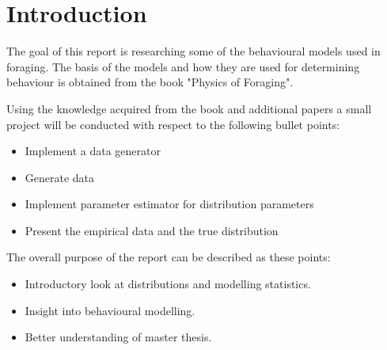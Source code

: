\chapter{Introduction}
The goal of this report is researching some of the behavioural models used in foraging. The basis of the models and how they are used for determining behaviour is obtained from the book "Physics of Foraging"\cite{viswanathan2011the}.

Using the knowledge acquired from the book and additional papers a small project will be conducted with respect to the following bullet points:
\begin{itemize}
\item Implement a data generator
\item Generate data
\item Implement parameter estimator for distribution parameters
\item Present the empirical data and the true distribution 
\end{itemize}

The overall purpose of the report can be described as these points:
\begin{itemize}
\item Introductory look at distributions and modelling statistics.
\item Insight into behavioural modelling.
\item Better understanding of master thesis.
\end{itemize}

